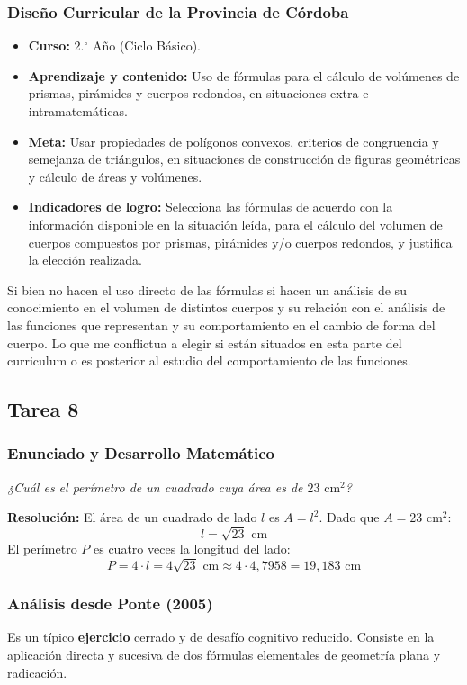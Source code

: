\documentclass[11pt,a4paper]{article}
\begin{document}
\subsubsection{Diseño Curricular de la Provincia de Córdoba}
\begin{itemize}
    \item \textbf{Curso:} 2.$^{\circ}$ Año (Ciclo Básico).
    \item \textbf{Aprendizaje y contenido:} Uso de fórmulas para el cálculo de volúmenes de prismas, pirámides y cuerpos redondos, en situaciones extra e intramatemáticas.
    \item \textbf{Meta:} Usar propiedades de polígonos convexos, criterios de congruencia y semejanza de triángulos, en situaciones de construcción de figuras geométricas y cálculo de áreas y volúmenes.
    \item \textbf{Indicadores de logro:} Selecciona las fórmulas de acuerdo con la información disponible en la situación leída, para el cálculo del volumen de cuerpos compuestos por prismas, pirámides y/o cuerpos redondos, y justifica la elección realizada.
\end{itemize}
Si bien no hacen el uso directo de las fórmulas si hacen un análisis de su conocimiento en el volumen de distintos cuerpos y su relación con el análisis de las funciones que representan y su comportamiento en el cambio de forma del cuerpo. Lo que me conflictua a elegir si están situados en esta parte del curriculum o es posterior al estudio del comportamiento de las funciones.
\subsection{Tarea 8}

\subsubsection{Enunciado y Desarrollo Matemático}
\textit{¿Cuál es el perímetro de un cuadrado cuya área es de $23\text{ cm}^2$?}

\textbf{Resolución:}
El área de un cuadrado de lado $l$ es $A = l^2$.
Dado que $A = 23\text{ cm}^2$:
\[
l = \sqrt{23}\text{ cm}
\]
El perímetro $P$ es cuatro veces la longitud del lado:
\[
P = 4 \cdot l = 4\sqrt{23}\text{ cm} \approx 4 \cdot 4{,}7958 = 19{,}183\text{ cm}
\]

\subsubsection{Análisis desde Ponte (2005)}
Es un típico \textbf{ejercicio} cerrado y de desafío cognitivo reducido. Consiste en la aplicación directa y sucesiva de dos fórmulas elementales de geometría plana y radicación.
\end{document}
